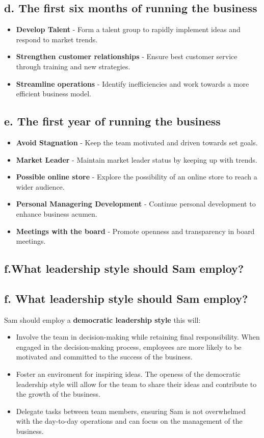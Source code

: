 \documentclass{article}
\begin{document}
\subsection{d. The first six months of running the business}
\begin{itemize}
    \item \textbf{Develop Talent} - Form a talent group to rapidly implement ideas and respond to market trends.
    \item \textbf{Strengthen customer relationships} - Ensure best customer service through training and new strategies.
    \item \textbf{Streamline operations} - Identify inefficiencies and work towards a more efficient business model.
\end{itemize}


\subsection{e. The first year of running the business}
\begin{itemize}
    \item \textbf{Avoid Stagnation} - Keep the team motivated and driven towards set goals.
    \item \textbf{Market Leader} - Maintain market leader status by keeping up with trends.
    \item \textbf{Possible online store} - Explore the possibility of an online store to reach a wider audience.
    \item \textbf{Personal Managering Development} - Continue personal development to enhance business acumen.
    \item \textbf{Meetings with the board} - Promote openness and transparency in board meetings.
\end{itemize}


\subsection{f.What leadership style should Sam employ?}

\subsection{f. What leadership style should Sam employ?}
Sam should employ a \textbf{democratic leadership style} this will:
\begin{itemize}
    \item Involve the team in decision-making while retaining final responsibility. When engaged in the decision-making process, employees are more likely to be motivated and committed to the success of the business.
    \item Foster an enviroment for inspiring ideas. The openess of the democratic leadership style will allow for the team to share their ideas and contribute to the growth of the business.
    \item Delegate tasks between team members, ensuring Sam is not overwhelmed with the day-to-day operations and can focus on the management of the business.
\end{itemize}
\end{document}
